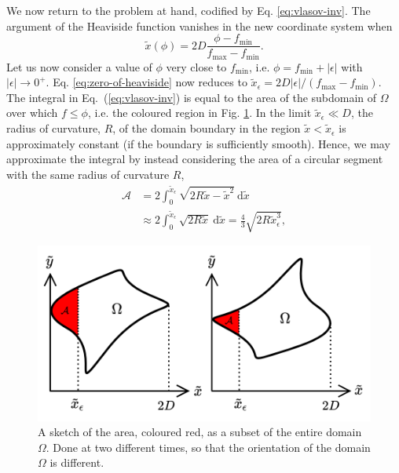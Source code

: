 We now return to the problem at hand, codified by Eq. \eqref{eq:vlasov-inv}. The argument of the Heaviside function vanishes in the new coordinate system when
\begin{equation}
    \tilde{x}(\phi) = 2D \frac{\phi - f_\mathrm{min}}{f_\mathrm{max}-f_\mathrm{min}}.
        \label{eq:zero-of-heaviside}
\end{equation}
Let us now consider a value of $\phi$ very close to $f_\mathrm{min}$, i.e. $\phi = f_\mathrm{min} + |\epsilon|$ with $|\epsilon| \rightarrow 0^+$. Eq. \eqref{eq:zero-of-heaviside} now reduces to $\tilde{x}_\epsilon = 2D|\epsilon|/(f_\mathrm{max}-f_\mathrm{min})$. The integral in Eq.~(\ref{eq:vlasov-inv}) is equal to the area of the subdomain of $\Omega$ over which $f \le \phi$, i.e. the coloured region in Fig. \ref{fig:sketch-of-area}. In the limit $\tilde{x}_\epsilon \ll D$, the radius of curvature, $R$, of the domain boundary in the region $\tilde x < \tilde x_\epsilon$ is approximately constant (if the boundary is sufficiently smooth). Hence, we may approximate the integral by instead considering the area of a circular segment with the same radius of curvature $R$,
\begin{equation}
\begin{aligned}
    \mathcal{A} &= 2\int_0^{\tilde{x}_\epsilon} \sqrt{2R\tilde{x}  - \tilde{x}^2} \: \mathrm{d} \tilde{x}  \\
    &\approx 2 \int_0^{\tilde{x}_\epsilon} \sqrt{2 R\tilde{x} } \: \mathrm{d} \tilde{x} = \frac{4}{3} \sqrt{2 R \tilde{x}_\epsilon^3},
\end{aligned}
\label{eq:circular-segment}
\end{equation}
\begin{figure}
    \centering
    \includegraphics[width=1.0\textwidth]{3_chapters/1_papers/AE-TE/figures/boundary-setup.png}
    \caption{A sketch of the area, coloured red, as a subset of the entire domain $\Omega$. Done at two different times, so that the orientation of the domain $\Omega$ is different.}
    \label{fig:sketch-of-area}
\end{figure}
